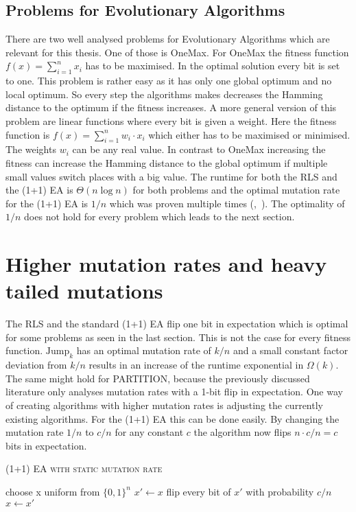 \subsection{Problems for Evolutionary Algorithms}
There are two well analysed problems for Evolutionary Algorithms which are relevant for this thesis.
One of those is OneMax.
For OneMax the fitness function $f(x)=\sum_{i=1}^{n}{x_i}$ has to be maximised.
In the optimal solution every bit is set to one.
This problem is rather easy as it has only one global optimum and no local optimum.
So every step the algorithms makes decreases the Hamming distance to the optimum if the fitness increases.
A more general version of this problem are linear functions where every bit is given a weight.
Here the fitness function is $f(x)=\sum_{i=1}^{n}{w_i \cdot x_i}$ which either has to be maximised or minimised.
The weights $w_i$ can be any real value.
In contrast to OneMax increasing the fitness can increase the Hamming distance to the global optimum if multiple small values switch places with a big value.
The runtime for both the RLS and the (1+1) EA is $\Theta(n\log{n})$ for both problems and the optimal mutation rate for the (1+1) EA is $1/n$ which was proven multiple times (\cite{witt2013tight},~\cite{doerr2023tight}).
The optimality of $1/n$ does not hold for every problem which leads to the next section.

\section{Higher mutation rates and heavy tailed mutations}
The RLS and the standard (1+1) EA flip one bit in expectation which is optimal for some problems as seen in the last section.
This is not the case for every fitness function.
$\text{Jump}_k$ has an optimal mutation rate of $k/n$ and a small constant factor deviation from $k/n$ results in an increase of the runtime exponential in $\Omega(k)$\cite{doerr2017fast}.
The same might hold for PARTITION, because the previously discussed literature only analyses mutation rates with a 1-bit flip in expectation.\newline
One way of creating algorithms with higher mutation rates is adjusting the currently existing algorithms.
For the (1+1) EA this can be done easily.
By changing the mutation rate $1/n$ to $c/n$ for any constant $c$ the algorithm now flips $n\cdot c/n=c$ bits in expectation.
\begin{algorithm}[bt]
      \caption{\textsc{(1+1) EA with static mutation rate}}\label{alg:EA_SM}

      \DontPrintSemicolon %

      \BlankLine
      choose x uniform from ${\{0,1\}}^n$\;
      {
      $x' \leftarrow x$\;
      flip every bit of $x'$ with probability $c/n$\;
      {
      {
            $x \leftarrow x'$\;
      }
      }
      }
\end{algorithm}

